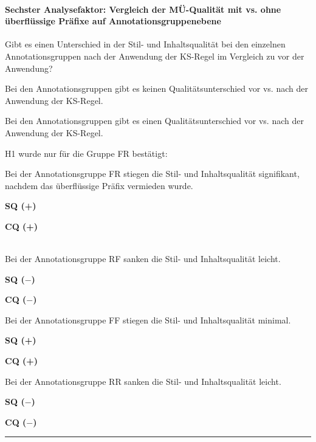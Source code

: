 \paragraph*{Sechster Analysefaktor: Vergleich der MÜ-Qualität mit vs. ohne überflüssige Präfixe auf Annotationsgruppenebene}
\begin{description}[font=\normalfont\bfseries]
\item [Fragestellung:] Gibt es einen Unterschied in der Stil- und Inhaltsqualität bei den einzelnen Annotationsgruppen nach der Anwendung der KS-Regel im Vergleich zu vor der Anwendung?
\item [H0 --] Bei den Annotationsgruppen gibt es keinen Qualitätsunterschied vor vs. nach der Anwendung der KS-Regel.
\item [H1 --] Bei den Annotationsgruppen gibt es einen Qualitätsunterschied vor vs. nach der Anwendung der KS-Regel.
\item [Resultat]
\end{description}
\noindent
\parbox[t]{.8\textwidth}{
H1 wurde nur für die Gruppe FR bestätigt:

Bei der Annotationsgruppe FR stiegen die Stil- und Inhaltsqualität signifikant, nachdem das überflüssige Präfix vermieden wurde.
}
\parbox[t]{.04\textwidth}{}
\colorbox{smGreen}{\parbox[t]{.15\textwidth}{
{ \textbf{SQ (+)}}

 \textbf{CQ (+)}\\
 \\
}}

\noindent
\parbox[t]{.8\textwidth}{
Bei der Annotationsgruppe RF sanken die Stil- und Inhaltsqualität leicht.
}
\parbox[t]{.04\textwidth}{}
\parbox[t]{.15\textwidth}{
\textbf{SQ ($-$)}

\textbf{CQ ($-$)}
}

\medskip
\noindent
\parbox[t]{.8\textwidth}{
Bei der Annotationsgruppe FF stiegen die Stil- und Inhaltsqualität minimal.
}
\parbox[t]{.04\textwidth}{}
\parbox[t]{.15\textwidth}{
{ \textbf{SQ (+)}}

\textbf{CQ (+)}
}

\medskip
\noindent
\parbox[t]{.8\textwidth}{
Bei der Annotationsgruppe RR sanken die Stil- und Inhaltsqualität leicht.
}
\parbox[t]{.04\textwidth}{}
\parbox[t]{.15\textwidth}{
{ \textbf{SQ ($-$)}}

\textbf{CQ ($-$)}
}
\smallskip
\hrule
